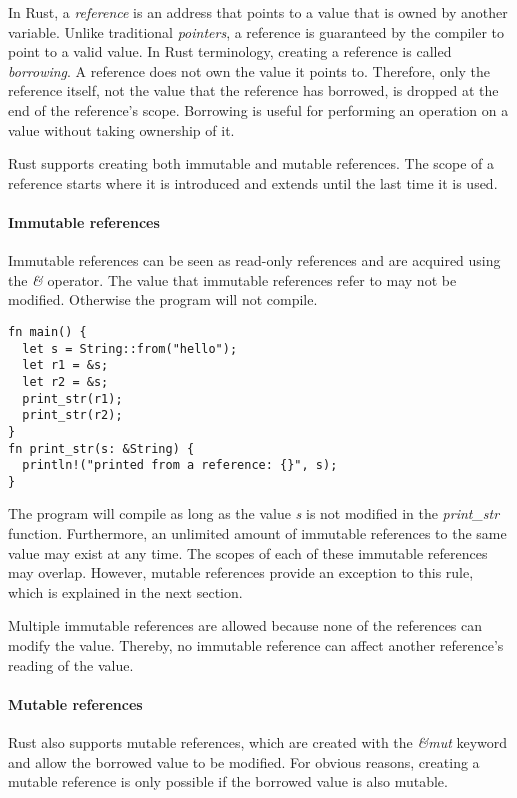 \documentclass[sigplan,11pt,nonacm]{acmart}
\begin{document}
In Rust, a \emph{reference} is an address that points to a value that is owned by another variable.
Unlike traditional \emph{pointers}, a reference is guaranteed by the compiler to point to a valid value.
In Rust terminology, creating a reference is called \emph{borrowing}.
A reference does not own the value it points to.
Therefore, only the reference itself, not the value that the reference has borrowed, is dropped at the end of the reference's scope.
Borrowing is useful for performing an operation on a value without taking ownership of it.

Rust supports creating both immutable and mutable references.
The scope of a reference starts where it is introduced and extends until the last time it is used.

\paragraph{Immutable references}

Immutable references can be seen as read-only references and are acquired using the \emph{\&} operator.
The value that immutable references refer to may not be modified.
Otherwise the program will not compile.

\begin{lstlisting}
fn main() {
  let s = String::from("hello");
  let r1 = &s;
  let r2 = &s;
  print_str(r1);
  print_str(r2);
}
fn print_str(s: &String) {
  println!("printed from a reference: {}", s);
}
\end{lstlisting}

The program will compile as long as the value \emph{s} is not modified in the \emph{print\_str} function.
Furthermore, an unlimited amount of immutable references to the same value may exist at any time.
The scopes of each of these immutable references may overlap.
However, mutable references provide an exception to this rule, which is explained in the next section.

Multiple immutable references are allowed because none of the references can modify the value.
Thereby, no immutable reference can affect another reference's reading of the value.


\paragraph{Mutable references}

Rust also supports mutable references, which are created with the \emph{&mut} keyword and allow the borrowed value to be modified.
For obvious reasons, creating a mutable reference is only possible if the borrowed value is also mutable.
\end{document}
